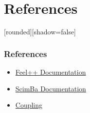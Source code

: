 \documentclass[10pt]{beamer}
\begin{document}

\section{References}
\begin{frame}
    [rounded][shadow=false]
    \frametitle{References}
    \begin{itemize}
    
        \item \href{https://docs.feelpp.org/user/latest/index.html}{Feel++ Documentation}
        
        \item \href{https://sciml.gitlabpages.inria.fr/scimba/}{ScimBa Documentation}

        \item \href{https://en.wikipedia.org/wiki/Coupling_(computer_programming)}{Coupling}
            
    \end{itemize}
\end{frame}
\end{document}
